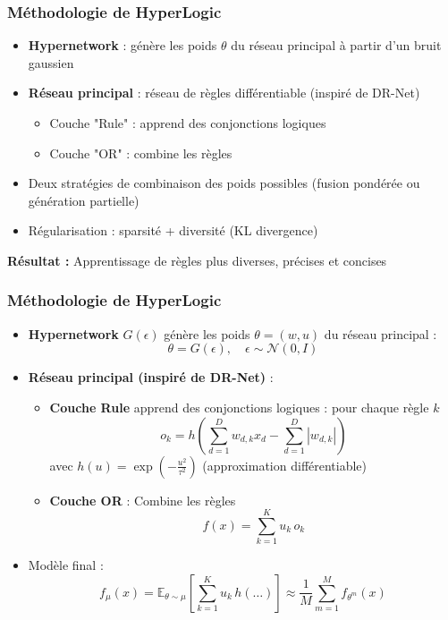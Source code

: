 \documentclass{beamer}
\begin{document}
\begin{frame}
\frametitle{Méthodologie de HyperLogic}

\begin{itemize}
    \item \textbf{Hypernetwork} : génère les poids $\theta$ du réseau principal à partir d'un bruit gaussien
    \item \textbf{Réseau principal} : réseau de règles différentiable (inspiré de DR-Net)
        \begin{itemize}
            \item Couche "Rule" : apprend des conjonctions logiques
            \item Couche "OR" : combine les règles
        \end{itemize}
    \item Deux stratégies de combinaison des poids possibles (fusion pondérée ou génération partielle)
    \item Régularisation : sparsité + diversité (KL divergence)
\end{itemize}

\begin{center}
\textbf{Résultat :} Apprentissage de règles plus diverses, précises et concises
\end{center}

\end{frame}

\begin{frame}
\frametitle{Méthodologie de HyperLogic}

\begin{itemize}
    \item \textbf{Hypernetwork} $G(\epsilon)$ génère les poids $\theta = (w, u)$ du réseau principal :
    $$
    \theta = G(\epsilon), \quad \epsilon \sim \mathcal{N}(0, I)
    $$
    
    \item \textbf{Réseau principal (inspiré de DR-Net)} :
    \begin{itemize}
        \item \textbf{Couche Rule} apprend des conjonctions logiques : pour chaque règle $k$
        $$
        o_k = h\left( \sum_{d=1}^D w_{d,k} x_d - \sum_{d=1}^D |w_{d,k}| \right)
        $$
        avec $h(u) = \exp\left(-\frac{u^2}{\tau^2}\right)$ (approximation différentiable)
        
        \item \textbf{Couche OR} : Combine les règles
        $$
        f(x) = \sum_{k=1}^K u_k \, o_k
        $$
    \end{itemize}
    
    \item Modèle final :
    $$
    f_\mu(x) = \mathbb{E}_{\theta \sim \mu} \left[ \sum_{k=1}^K u_k \, h(\dots) \right] \approx \frac{1}{M} \sum_{m=1}^M f_{\theta^m}(x)
    $$
\end{itemize}

\end{frame}
\end{document}
